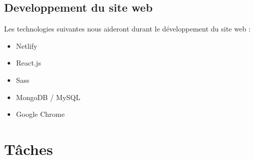 \documentclass{article}
\begin{document}
\subsection{Developpement du site web}
Les technologies suivantes nous aideront durant le développement du site web :
\begin{itemize}
    \item Netlify
    \item React.js
    \item Sass
    \item MongoDB / MySQL
    \item Google Chrome
\end{itemize}

\setlength{\tabcolsep}{15pt}
\renewcommand{\arraystretch}{2}

\section{Tâches}
\end{document}
